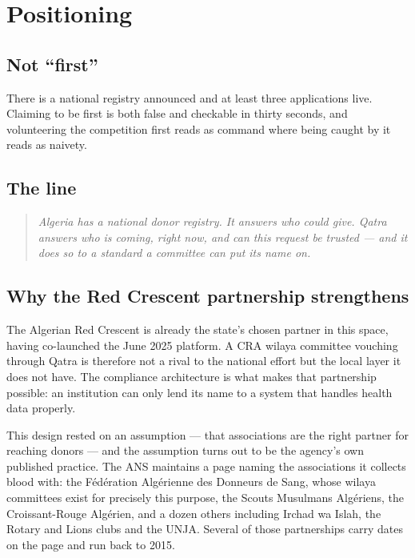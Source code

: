 \documentclass[11pt,a4paper]{article}
\begin{document}
\section{Positioning}\label{sec:cra}

\subsection{Not ``first''}

There is a national registry announced and at least three applications live.
Claiming to be first is both false and checkable in thirty seconds, and
volunteering the competition first reads as command where being caught by it
reads as naivety.

\subsection{The line}

\begin{quote}\itshape
Algeria has a national donor registry. It answers \emph{who could give}. Qatra
answers \emph{who is coming, right now, and can this request be trusted} — and
it does so to a standard a committee can put its name on.
\end{quote}

\subsection{Why the Red Crescent partnership strengthens}

The Algerian Red Crescent is already the state's chosen partner in this space,
having co-launched the June 2025 platform. A CRA wilaya committee vouching
through Qatra is therefore not a rival to the national effort but the local
layer it does not have. The compliance architecture is what makes that
partnership possible: an institution can only lend its name to a system that
handles health data properly.

This design rested on an assumption --- that associations are the right partner
for reaching donors --- and the assumption turns out to be the agency's own
published practice. The ANS maintains a page naming the associations it
collects blood with: the F\'ed\'eration Alg\'erienne des Donneurs de Sang, whose
wilaya committees exist for precisely this purpose, the Scouts Musulmans
Alg\'eriens, the Croissant-Rouge Alg\'erien, and a dozen others including Irchad
wa Islah, the Rotary and Lions clubs and the UNJA. Several of those
partnerships carry dates on the page and run back to 2015.
\end{document}
